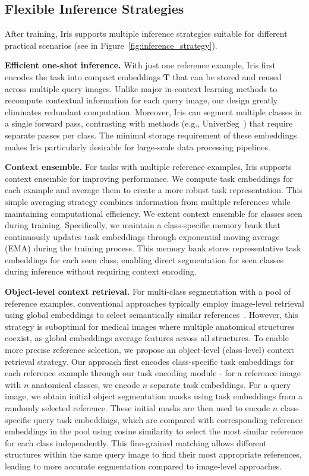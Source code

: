 \subsection{Flexible Inference Strategies}
After training, Iris supports multiple inference strategies suitable for different practical scenarios (see in Figure~\ref{fig:inference_strategy}).


\noindent\textbf{Efficient one-shot inference.} With just one reference example, Iris first encodes the task into compact embeddings $\boldsymbol{T}$ that can be stored and reused across multiple query images. Unlike major in-context learning methods to recompute contextual information for each query image, our design greatly eliminates redundant computation. Moreover, Iris can segment multiple classes in a single forward pass, contrasting with methods (e.g., UniverSeg~\cite{butoi2023universeg}) that require separate passes per class. The minimal storage requirement of these embeddings makes Iris particularly desirable for large-scale data processing pipelines.


\noindent\textbf{Context ensemble.}
For tasks with multiple reference examples, Iris supports context ensemble for improving performance. We compute task embeddings for each example and average them to create a more robust task representation. This simple averaging strategy combines information from multiple references while maintaining computational efficiency. We extent context ensemble for classes seen during training. Specifically, we maintain a class-specific memory bank that continuously updates task embeddings through exponential moving average (EMA) during the training process. This memory bank stores representative task embeddings for each seen class, enabling direct segmentation for seen classes during inference without requiring context encoding.


\noindent\textbf{Object-level context retrieval.} For multi-class segmentation with a pool of reference examples, conventional approaches typically employ image-level retrieval using global embeddings to select semantically similar references~\cite{zhang2023makes}. However, this strategy is suboptimal for medical images where multiple anatomical structures coexist, as global embeddings average features across all structures. To enable more precise reference selection, we propose an object-level (class-level) context retrieval strategy. Our approach first encodes class-specific task embeddings for each reference example through our task encoding module - for a reference image with $n$ anatomical classes, we encode $n$ separate task embeddings. For a query image, we obtain initial object segmentation masks using task embeddings from a randomly selected reference. These initial masks are then used to encode $n$ class-specific query task embeddings, which are compared with corresponding reference embeddings in the pool using cosine similarity to select the most similar reference for each class independently. This fine-grained matching allows different structures within the same query image to find their most appropriate references, leading to more accurate segmentation compared to image-level approaches.




